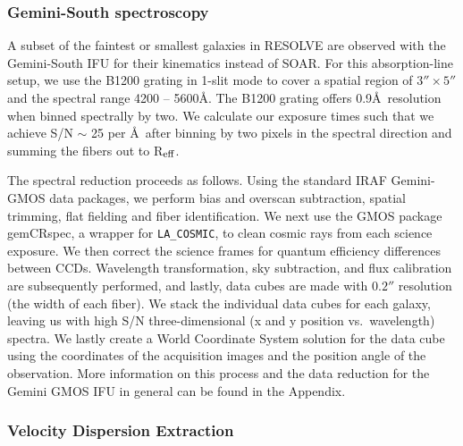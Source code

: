 \documentclass[iop,apj]{emulateapj}
\newcommand{\Reff}{R$_{\rm eff}$}
\begin{document}
\subsubsection{Gemini-South spectroscopy}

  A subset of the faintest or smallest galaxies in RESOLVE are observed with the Gemini-South IFU for their kinematics instead of SOAR. For this absorption-line setup, we use the B1200 grating in 1-slit mode to cover a spatial region of $3''\times5''$ and the spectral range 4200 -- 5600\AA. The B1200 grating offers 0.9\AA\ resolution when binned spectrally by two. We calculate our exposure times such that we achieve S/N $\sim$ 25 per \AA\, after binning by two pixels in the spectral direction and summing the fibers out to \Reff.

The spectral reduction proceeds as follows. Using the standard IRAF Gemini-GMOS data packages, we perform bias and overscan subtraction, spatial trimming, flat fielding and fiber identification. We next use the GMOS package gemCRspec, a wrapper for \texttt{LA\_COSMIC}, to clean cosmic rays from each science exposure. We then correct the science frames for quantum efficiency differences between CCDs. Wavelength transformation, sky subtraction, and flux calibration are subsequently performed, and lastly, data cubes are made with $0.2''$ resolution (the width of each fiber). We stack the individual data cubes for each galaxy, leaving us with high S/N three-dimensional (x and y position vs.~wavelength) spectra. We lastly create a World Coordinate System \citep[WCS,][]{Greisen2002} solution for the data cube using the coordinates of the acquisition images and the position angle of the observation. More information on this process and the data reduction for the Gemini GMOS IFU in general can be found in the Appendix.

\subsubsection{Velocity Dispersion Extraction}
\end{document}
